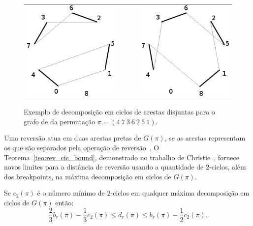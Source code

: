 \begin{figure}[h]
  \centering 
  \begin{tabular}{ccc} 
  \includegraphics[scale=0.6]{images/rev_grafo_bkp_dec2cic-1.png}
  & ~~~~
  & \includegraphics[scale=0.6]{images/rev_grafo_bkp_dec2cic-2.png} 
  \end{tabular} 
  \caption{Exemplo de decomposição em ciclos de arestas disjuntas para
  o grafo de \bkp{} da permutação $\pi = (4~7~3~6~2~5~1)$.}
  \label{fig:rev_grafo_bkp_dec2cic}
\end{figure}

Uma reversão atua em duas arestas pretas de $G(\pi)$, se as arestas
representam os \bkp{} que são separados pela operação de
reversão~\cite{Christie*1998}. O Teorema~\ref{teo:rev_cic_bound},
demonstrado no trabalho de Christie~\cite{Christie*1998}, fornece novos
limites para a distância de reversão usando a quantidade de $2$-ciclos,
além dos breakpoints, na máxima decomposição em ciclos de $G(\pi)$.

\begin{teo}
\label{teo:rev_cic_bound}
Se $c_{2}(\pi)$ é o número mínimo de $2$-ciclos em qualquer máxima
decomposição em ciclos de $G(\pi)$ então: 
\[
\frac{2}{3} b_r(\pi)
- \frac{1}{3} c_{2}(\pi) \leq d_r(\pi) \leq b_r(\pi) - \frac{1}{2}
c_{2}(\pi).
\]
\end{teo}


